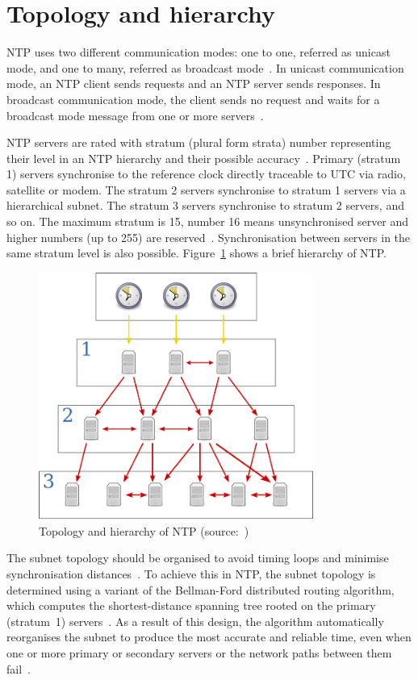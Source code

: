 
\section{Topology and hierarchy}\label{sec:ntp-topology}
NTP uses two different communication modes:
one to one, referred as unicast mode, and one to many, referred as broadcast mode~\cite{rfc5905}.
In unicast communication mode, an NTP client sends requests and an NTP server sends responses.
In broadcast communication mode, the client sends no request
and waits for a broadcast mode message from one or more servers~\cite{rfc5905}.

NTP servers are rated with stratum (plural form strata) number representing their level
in an NTP hierarchy and their possible accuracy~\cite{rfc5905}.
Primary (stratum 1) servers synchronise to the reference clock directly traceable to UTC via
radio, satellite or modem.
The stratum 2 servers synchronise to stratum 1
servers via a hierarchical subnet.
The stratum 3 servers synchronise to stratum 2 servers, and so on.
The maximum stratum is 15, number 16 means unsynchronised server
and higher numbers (up to 255) are reserved~\cite{rfc5905}.
Synchronisation between servers in the same stratum level is also possible.
Figure~\ref{fig:ntp-hierarchy} shows a brief hierarchy of NTP.
\begin{figure}
  \centering
  \includegraphics[width=9cm,keepaspectratio]{fig/Network_Time_Protocol_servers_and_clients.pdf}
  \caption{Topology and hierarchy of NTP (source:~\cite{wikimedia-ntp})}
  \label{fig:ntp-hierarchy}
  \bigskip
\end{figure}
The subnet topology should be organised to avoid timing loops
and minimise synchronisation distances~\cite{rfc5905}.
To achieve this in NTP, the subnet topology is determined using a variant
of the Bellman-Ford distributed routing algorithm, which computes
the shortest-distance spanning tree rooted on the primary (stratum~1) servers~\cite{rfc5905}.
As a result of this design, the
algorithm automatically reorganises the subnet to produce the most accurate and reliable time,
even when one or more primary or secondary servers or the network paths between them fail~\cite{rfc5905}.
